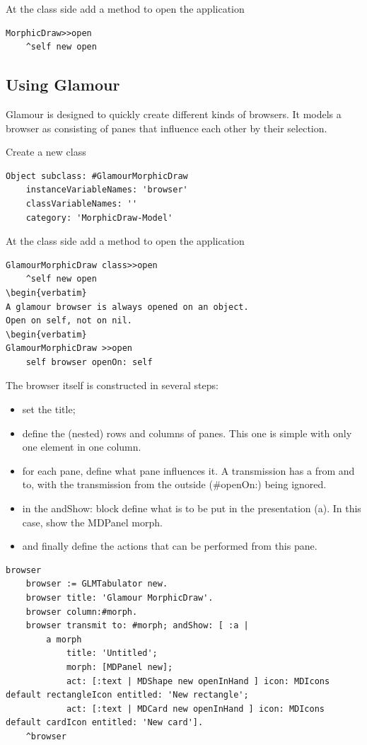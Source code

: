 \documentclass[10pt]{article}   	%
\begin{document}
At the class side add a method to open the application

\begin{verbatim}
MorphicDraw>>open
    ^self new open
\end{verbatim}
\subsection{Using Glamour}
Glamour is designed to quickly create different kinds of browsers.
It models a browser as consisting of panes that influence each other 
by their selection. 

Create a new class
\begin{verbatim}
Object subclass: #GlamourMorphicDraw
    instanceVariableNames: 'browser'
    classVariableNames: ''
    category: 'MorphicDraw-Model' 
\end{verbatim}
At the class side add a method to open the application
\begin{verbatim}
GlamourMorphicDraw class>>open
    ^self new open
\begin{verbatim}
A glamour browser is always opened on an object. 
Open on self, not on nil.
\begin{verbatim}
GlamourMorphicDraw >>open
    self browser openOn: self
\end{verbatim}
The browser itself is constructed in several steps:
\begin{itemize}
\item set the title;
\item define the (nested) rows and columns of panes.
This one is simple with only one element in one column.
\item for each pane, define what pane influences it. 
A transmission has a from and to, with the transmission from
the outside (\#openOn:) being ignored.
\item in the andShow: block define what is to be put in the
presentation (a). In this case, show the MDPanel morph.
\item and finally define the actions that can be performed
from this pane.
\end{itemize}
\begin{verbatim}
browser
    browser := GLMTabulator new.
    browser title: 'Glamour MorphicDraw'.
    browser column:#morph.
    browser transmit to: #morph; andShow: [ :a |
        a morph 
            title: 'Untitled';
            morph: [MDPanel new];
            act: [:text | MDShape new openInHand ] icon: MDIcons default rectangleIcon entitled: 'New rectangle';
            act: [:text | MDCard new openInHand ] icon: MDIcons default cardIcon entitled: 'New card'].
    ^browser
\end{verbatim}
\end{document}
